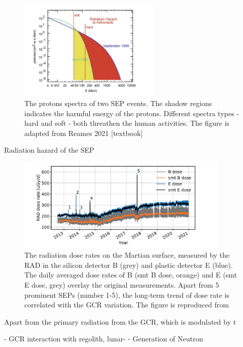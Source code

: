 \begin{figure}
	\centering
	\includegraphics[width = 0.6\textwidth]{images/SEP-radiation_hazard.png}
	\caption{The protons spectra of two SEP events. The shadow regions indicates the harmful energy of the protons. Different spectra types - hard and soft - both threathen the human activities. The figure is adapted from Reames 2021 [textbook]}
	\label{Fig:SEP-radiation_hazard}
\end{figure}
Radiation hazard of the SEP 


\begin{figure}
	\centering
	\includegraphics[width = 0.9\textwidth]{images/Rad_GCR_radiation.png}

	\caption{The radiation dose rates on the Martian surface, measured by the \ac{RAD} in the silicon detector B (grey) and plastic detector E (blue). The daily averaged dose rates of B (smt B dose, orange) and E (smt E dose, grey) overlay the original measurements. Apart from 5 prominent SEPs (number 1-5), the long-term trend of dose rate is correlated with the \ac{GCR} variation. The figure is reproduced from \citep{Guo2021AARv_rad}}
	\label{Fig:Rad_GCR_radiation}
\end{figure}
	
Apart from the primary radiation from the GCR, which is modulated by t

- GCR interaction with regolith, lunar-
	- Generation of Neutron

